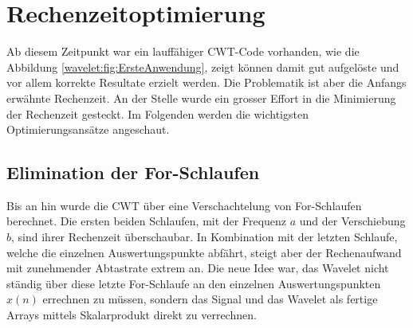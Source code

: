 %
%
%
%
\section{Rechenzeitoptimierung
\label{wavelets:section:teil3}}
Ab diesem Zeitpunkt war ein lauffähiger CWT-Code vorhanden, wie die Abbildung \ref{wavelet:fig:ErsteAnwendung}, zeigt können damit gut aufgelöste und vor allem korrekte Resultate erzielt werden. Die Problematik ist aber die Anfangs erwähnte Rechenzeit. An der Stelle wurde ein grosser Effort in die Minimierung der Rechenzeit gesteckt. Im Folgenden werden die wichtigsten Optimierungsansätze angeschaut.



\subsection{Elimination der For-Schlaufen
	\label{wavelets:subsection:EliminationForSchlaufen}}
Bis an hin wurde die CWT über eine Verschachtelung von For-Schlaufen berechnet. Die ersten beiden Schlaufen, mit der Frequenz $a$ und der Verschiebung $b$, sind ihrer Rechenzeit überschaubar.
In Kombination mit der letzten Schlaufe, welche die einzelnen Auswertungspunkte abfährt, steigt aber der Rechenaufwand mit zunehmender Abtastrate extrem an.
Die neue Idee war, das Wavelet nicht ständig über diese letzte For-Schlaufe an den einzelnen Auswertungspunkten $x(n)$ errechnen zu müssen, sondern das Signal und das Wavelet als fertige Arrays mittels Skalarprodukt direkt zu verrechnen.

